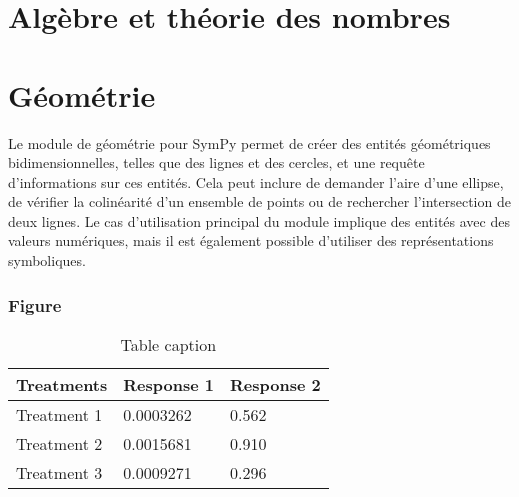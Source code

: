 \documentclass[11pt,fleqn]{book} %
\begin{document}
\part{Algèbre et théorie des nombres}







\part{Géométrie}
Le module de géométrie pour SymPy permet de créer des entités géométriques bidimensionnelles, telles que des lignes et des cercles, et une requête d'informations sur ces entités. Cela peut inclure de demander l’aire d’une ellipse, de vérifier la colinéarité d’un ensemble de points ou de rechercher l’intersection de deux lignes. Le cas d'utilisation principal du module implique des entités avec des valeurs numériques, mais il est également possible d'utiliser des représentations symboliques.







\section{Figure}

\begin{table}[h]
\centering
\begin{tabular}{l l l}
\toprule
\textbf{Treatments} & \textbf{Response 1} & \textbf{Response 2}\\
\midrule
Treatment 1 & 0.0003262 & 0.562 \\
Treatment 2 & 0.0015681 & 0.910 \\
Treatment 3 & 0.0009271 & 0.296 \\
\bottomrule
\end{tabular}
\caption{Table caption}
\end{table}
\end{document}
